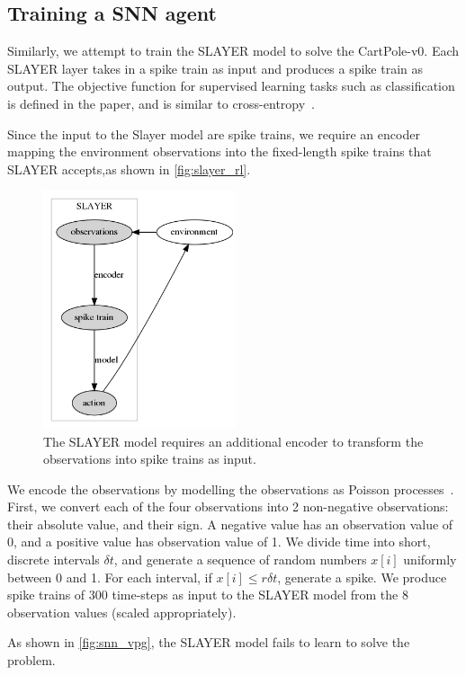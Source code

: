 \documentclass[fyp]{socreport}
\begin{document}
\subsection{Training a SNN agent}

Similarly, we attempt to train the SLAYER model to solve the CartPole-v0. Each
SLAYER layer takes in a spike train as input and produces a spike train as
output. The objective function for supervised learning tasks such as
classification is defined in the paper, and is similar to
cross-entropy~\cite{NIPS2018_7415}.

Since the input to the Slayer model are spike trains, we require an encoder
mapping the environment observations into the fixed-length spike trains that
SLAYER accepts,as shown in \autoref{fig:slayer_rl}.

\begin{figure}[htbp] \centering
\includegraphics[height=7cm]{images/snn_encode.png}
\caption{\label{fig:slayer_rl} The SLAYER model requires an additional encoder
to transform the observations into spike trains as input.}
\end{figure}

We encode the observations by modelling the observations as Poisson
processes~\cite{heeger2000poisson}. First, we convert each of the four
observations into 2 non-negative observations: their absolute value, and their
sign. A negative value has an observation value of 0, and a positive value has
observation value of 1. We divide time into short, discrete intervals
\(\delta t\), and generate a sequence of random numbers \(x[i]\) uniformly
between 0 and 1. For each interval, if \(x[i] \le r \delta t\), generate a
spike. We produce spike trains of 300 time-steps as input to the SLAYER model
from the 8 observation values (scaled appropriately).

As shown in \autoref{fig:snn_vpg}, the SLAYER model fails to learn to solve the
problem.
\end{document}
